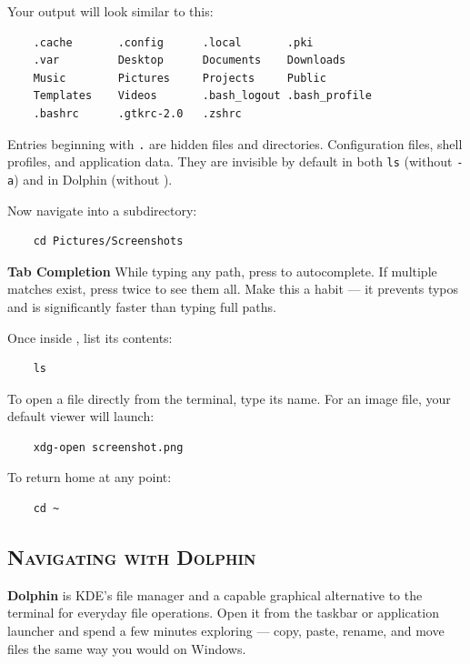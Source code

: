 \documentclass{article}
\newcommand{\code}[1]{\colorbox{codebg}{\texttt{#1}}}
\begin{document}
Your output will look similar to this:

\begin{verbatim}
	.cache       .config      .local       .pki
	.var         Desktop      Documents    Downloads
	Music        Pictures     Projects     Public
	Templates    Videos       .bash_logout .bash_profile
	.bashrc      .gtkrc-2.0   .zshrc
\end{verbatim}

\noindent Entries beginning with \code{.} are hidden files and directories. Configuration
files, shell profiles, and application data. They are invisible by default in both
\code{ls} (without \code{-a}) and in Dolphin (without ).

Now navigate into a subdirectory:

\begin{verbatim}
	cd Pictures/Screenshots
\end{verbatim}

\begin{callout}{\textbf{Tab Completion}}
	While typing any path, press  to autocomplete. If multiple matches exist,
	press  twice to see them all. Make this a habit --- it prevents typos and
	is significantly faster than typing full paths.
\end{callout}

Once inside , list its contents:

\begin{verbatim}
	ls
\end{verbatim}

To open a file directly from the terminal, type its name. For an image file, your
default viewer will launch:

\begin{verbatim}
	xdg-open screenshot.png
\end{verbatim}

To return home at any point:

\begin{verbatim}
	cd ~
\end{verbatim}

\subsection{\textsc{Navigating with Dolphin}}

\textbf{Dolphin} is KDE's file manager and a capable graphical alternative to the
terminal for everyday file operations. Open it from the taskbar or application
launcher and spend a few minutes exploring --- copy, paste, rename, and move files
the same way you would on Windows.
\end{document}

